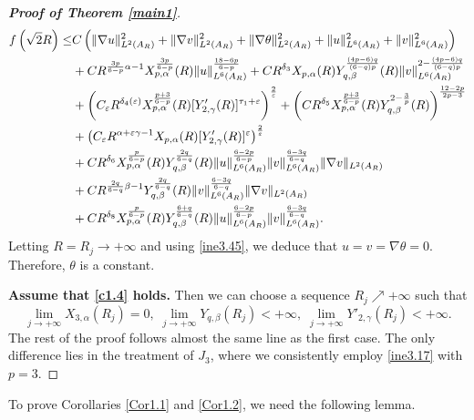 \documentclass[11pt,reqno]{amsart}
\numberwithin{Thm}{section}
\begin{document}
\begin{proof}[{\bf Proof of Theorem \ref{main1}}]
\begin{align*}
f\left(\sqrt{2}R\right)\leq&C\left(\|\nabla u\|_{L^{2}(A_{R})}^2+\|\nabla v\|_{L^{2}(A_{R})}^2+\|\nabla\theta\|_{L^2(A_{R})}^2+\|u\|_{L^6(A_{R})}^2 +\|v\|_{L^6(A_{R})}^2\right)\\
&+CR^{\frac{3p}{6-p}\alpha-1}X^{\frac{3p}{6-p}}_{p,\alpha}(R)\|u\|_{L^6(A_{R})}^{\frac{18-6p}{6-p}}+CR^{\delta_3}X_{p,\alpha}(R)Y^\frac{(4p-6)q}{(6-q)p}_{q,\beta}(R)\|v\|_{L^6(A_{R})}^{2-\frac{(4p-6)q}{(6-q)p}}\\
&+\left(C_\varepsilon R^{\delta_4(\varepsilon)}X^\frac{p+3}{6-p}_{p,\alpha}(R)[Y'_{2,\gamma}(R)]^{\tau_1+\varepsilon}\right)^\frac{2}{\varepsilon}+\left(CR^{\delta_5}X^\frac{p+3}{6-p}_{p,\alpha}(R)Y^{2-\frac{3}{p}}_{q,\beta}(R)\right)^\frac{12-2p}{2p-3}\\
&+\left(C_\varepsilon R^{\alpha+\varepsilon\gamma-1}X_{p,\alpha}(R)[Y'_{2,\gamma}(R)]^{\varepsilon}\right)^\frac{2}{\varepsilon}\\
&+CR^{\delta_6}X^\frac{p}{6-p}_{p,\alpha}(R)Y^\frac{2q}{6-q}_{q,\beta}(R)\|u\|_{L^6(A_R)}^{\frac{6-2p}{6-p}}  \|v\|_{L^6(A_R)}^{\frac{6-3q}{6-q}}\|\nabla v\|_{L^2(A_R)}\notag\\
&+CR^{\frac{2q}{6-q}\beta-1}Y^\frac{2q}{6-q}_{q,\beta}(R)\|v\|_{L^6(A_R)}^{\frac{6-3q}{6-q}}\|\nabla v\|_{L^2(A_R)}\\
&+CR^{\delta_8}X^\frac{p}{6-p}_{p,\alpha}(R)Y^\frac{6+q}{6-q}_{q,\beta}(R)\|u\|_{L^6(A_R)}^{\frac{6-2p}{6-p}} \|v\|_{L^6(A_R)}^{\frac{6-3q}{6-q}}.
\end{align*}
Letting $R=R_j\rightarrow+\infty$ and using \eqref{ine3.45}, we deduce that $u=v=\nabla\theta=0$. Therefore, $\theta$ is a constant.




{\bf Assume that \eqref{c1.4}  holds.} Then we can choose a sequence $R_j\nearrow+\infty$ such that
\begin{equation*}
\lim\limits_{j\rightarrow+\infty}X_{3,\alpha}(R_j)=0,\;\lim\limits_{j\rightarrow+\infty}Y_{q,\beta}(R_j)<+\infty,\;\lim\limits_{j\rightarrow+\infty}Y'_{2,\gamma}(R_j)<+\infty.
\end{equation*}
The rest of the proof follows almost the same line as the first case. The only difference lies in the treatment of $J_3$,  where we consistently employ \eqref{ine3.17} with $p=3$.
\end{proof}

To prove Corollaries \ref{Cor1.1} and \ref{Cor1.2}, we need the following lemma.
\end{document}
